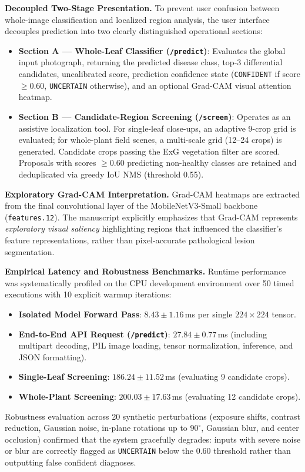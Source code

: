 \documentclass[pdflatex,sn-mathphys-num]{sn-jnl}
\theoremstyle{thmstyleone}%
\theoremstyle{thmstyletwo}%
\theoremstyle{thmstylethree}%
\begin{document}
\textbf{Decoupled Two-Stage Presentation.}
To prevent user confusion between whole-image classification and localized region analysis, the user interface decouples prediction into two clearly distinguished operational sections:
\begin{itemize}
  \item \textbf{Section A --- Whole-Leaf Classifier (\texttt{/predict})}: Evaluates the global input photograph, returning the predicted disease class, top-3 differential candidates, uncalibrated score, prediction confidence state (\texttt{CONFIDENT} if score $\geq 0.60$, \texttt{UNCERTAIN} otherwise), and an optional Grad-CAM visual attention heatmap.
  \item \textbf{Section B --- Candidate-Region Screening (\texttt{/screen})}: Operates as an assistive localization tool. For single-leaf close-ups, an adaptive 9-crop grid is evaluated; for whole-plant field scenes, a multi-scale grid (12--24 crops) is generated. Candidate crops passing the ExG vegetation filter are scored. Proposals with scores $\geq 0.60$ predicting non-healthy classes are retained and deduplicated via greedy IoU NMS (threshold 0.55).
\end{itemize}

\textbf{Exploratory Grad-CAM Interpretation.}
Grad-CAM heatmaps are extracted from the final convolutional layer of the MobileNetV3-Small backbone (\texttt{features.12}). The manuscript explicitly emphasizes that Grad-CAM represents \textit{exploratory visual saliency} highlighting regions that influenced the classifier's feature representations, rather than pixel-accurate pathological lesion segmentation.

\textbf{Empirical Latency and Robustness Benchmarks.}
Runtime performance was systematically profiled on the CPU development environment over 50 timed executions with 10 explicit warmup iterations:
\begin{itemize}
  \item \textbf{Isolated Model Forward Pass}: $8.43 \pm 1.16$\,ms per single $224 \times 224$ tensor.
  \item \textbf{End-to-End API Request (\texttt{/predict})}: $27.84 \pm 0.77$\,ms (including multipart decoding, PIL image loading, tensor normalization, inference, and JSON formatting).
  \item \textbf{Single-Leaf Screening}: $186.24 \pm 11.52$\,ms (evaluating 9 candidate crops).
  \item \textbf{Whole-Plant Screening}: $200.03 \pm 17.63$\,ms (evaluating 12 candidate crops).
\end{itemize}
Robustness evaluation across 20 synthetic perturbations (exposure shifts, contrast reduction, Gaussian noise, in-plane rotations up to $90^\circ$, Gaussian blur, and center occlusion) confirmed that the system gracefully degrades: inputs with severe noise or blur are correctly flagged as \texttt{UNCERTAIN} below the 0.60 threshold rather than outputting false confident diagnoses.
\end{document}
